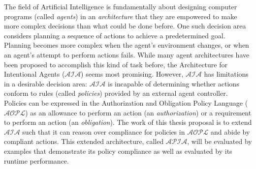 The field of Artificial Intelligence is fundamentally about designing computer programs (called \textit{agents}) in an \textit{architecture} that they are empowered to make more complex decisions than what could be done before.
One such decision area considers planning a sequence of actions to achieve a predetermined goal.
Planning becomes more complex when the agent's environment changes, or when an agent's attempt to perform actions fails.
While many agent architectures have been proposed to accomplish this kind of task before, the Architecture for Intentional Agents ($\mathcal{AIA}$) seems most promising.
However, $\mathcal{AIA}$ has limitations in a desirable decision area: $\mathcal{AIA}$ is incapable of determining whether actions conform to rules (called \textit{policies}) provided by an external agent controller.
Policies can be expressed in the Authorization and Obligation Policy Language ($\mathcal{AOPL}$) as an allowance to perform an action (an \textit{authorization}) or a requirement to perform an action (an \textit{obligation}).
The work of this thesis proposal is to extend $\mathcal{AIA}$ such that it can reason over compliance for policies in $\mathcal{AOPL}$ and abide by compliant actions.
This extended architecture, called $\mathcal{APIA}$, will be evaluated by examples that demonstrate its policy compliance as well as evaluated by its runtime performance.

